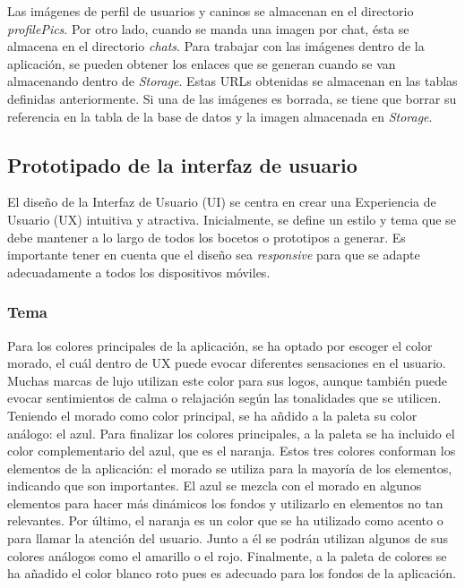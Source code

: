 \documentclass[a4paper, 12pt]{article}
\begin{document}
Las imágenes de perfil de usuarios y caninos se almacenan en el directorio \textit{profilePics}. Por otro lado, cuando se manda una imagen por chat, ésta se almacena en el directorio \textit{chats}. Para trabajar con las imágenes dentro de la aplicación, se pueden obtener los enlaces que se generan cuando se van almacenando dentro de \textit{Storage}. Estas URLs obtenidas se almacenan en las tablas definidas anteriormente. Si una de las imágenes es borrada, se tiene que borrar su referencia en la tabla de la base de datos y la imagen almacenada en \textit{Storage}.

\subsection{Prototipado de la interfaz de usuario}

El diseño de la Interfaz de Usuario (UI) se centra en crear una Experiencia de Usuario (UX) intuitiva y atractiva. Inicialmente, se define un estilo y tema que se debe mantener a lo largo de todos los bocetos o prototipos a generar. Es importante tener en cuenta que el diseño sea \textit{responsive} para que se adapte adecuadamente a todos los dispositivos móviles.

\subsubsection{Tema}

Para los colores principales de la aplicación, se ha optado por escoger el color morado, el cuál dentro de UX puede evocar diferentes sensaciones en el usuario. Muchas marcas de lujo utilizan este color para sus logos, aunque también puede evocar sentimientos de calma o relajación según las tonalidades que se utilicen. Teniendo el morado como color principal, se ha añdido a la paleta su color análogo: el azul. Para finalizar los colores principales, a la paleta se ha incluido el color complementario del azul, que es el naranja. Estos tres colores conforman los elementos de la aplicación: el morado se utiliza para la mayoría de los elementos, indicando que son importantes. El azul se mezcla con el morado en algunos elementos para hacer más dinámicos los fondos y utilizarlo en elementos no tan relevantes. Por último, el naranja es un color que se ha utilizado como acento o para llamar la atención del usuario. Junto a él se podrán utilizan algunos de sus colores análogos como el amarillo o el rojo. Finalmente, a la paleta de colores se ha añadido el color blanco roto pues es adecuado para los fondos de la aplicación.
\end{document}
